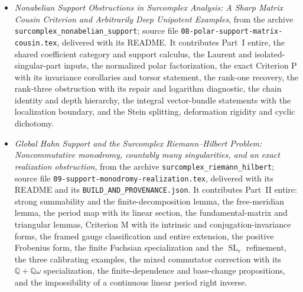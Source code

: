 \documentclass[11pt,letterpaper]{article}
\theoremstyle{definition}
\theoremstyle{remark}
\newcommand{\Q}{\mathbb Q}
\newcommand{\SL}{\operatorname{SL}}
\numberwithin{equation}{section}
\begin{document}
\begin{itemize}
\item \emph{Nonabelian Support Obstructions in Surcomplex Analysis: A Sharp
Matrix Cousin Criterion and Arbitrarily Deep Unipotent Examples}, from the
archive \texttt{surcomplex\_nonabelian\_support}; source file
\texttt{08-polar-support-matrix-cousin.tex}, delivered with its README. It
contributes Part~I entire, the shared coefficient category and support
calculus, the Laurent and isolated-singular-part inputs, the normalized polar
factorization, the exact Criterion P with its invariance corollaries and torsor
statement, the rank-one recovery, the rank-three obstruction with its repair
and logarithm diagnostic, the chain identity and depth hierarchy, the integral
vector-bundle statements with the localization boundary, and the Stein
splitting, deformation rigidity and cyclic dichotomy.

\item \emph{Global Hahn Support and the Surcomplex Riemann--Hilbert Problem:
Noncommutative monodromy, countably many singularities, and an exact
realization obstruction}, from the archive
\texttt{surcomplex\_riemann\_hilbert}; source file
\texttt{09-support-monodromy-realization.tex}, delivered with its README and
its
\texttt{BUILD\_AND\_PROVENANCE.json}. It contributes Part~II entire: strong
summability and the finite-decomposition lemma, the free-meridian lemma, the
period map with its linear section, the fundamental-matrix and triangular
lemmas, Criterion M with its intrinsic and conjugation-invariance forms, the
framed gauge classification and entire extension, the positive Frobenius form,
the finite Fuchsian specialization and the $\SL_r$ refinement, the three
calibrating examples, the mixed commutator correction with its $\Q+\Q\omega$
specialization, the finite-dependence and base-change propositions, and the
impossibility of a continuous linear period right inverse.


\end{itemize}
\end{document}
